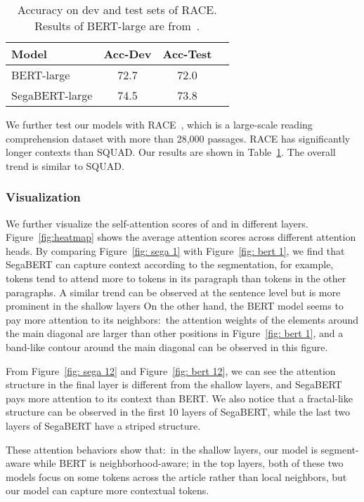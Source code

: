 \documentclass[letterpaper]{article}
\begin{document}
\begin{table}[t]\centering
  \small
  \begin{tabular}{lccc}\toprule
  Model&Acc-Dev &Acc-Test \\\midrule
  BERT-large &72.7 &72.0 \\
  SegaBERT-large &74.5 &73.8 \\
  \bottomrule
  \end{tabular}
  \caption{Accuracy on dev and test sets of RACE. Results of BERT-large are from~\citet{DBLP:conf/acl-mrqa/PanSYCJCY19}.}
  \label{tab: race}
  \end{table} 
We further test our models with RACE~\citep{DBLP:conf/emnlp/LaiXLYH17}, which is a large-scale reading comprehension dataset with more than 28,000 passages. 
RACE has significantly longer contexts than SQUAD.
Our results are shown in Table~\ref{tab: race}.
The overall trend is similar to SQUAD.






\subsubsection{Visualization}


We further visualize the self-attention scores of  and  in different layers. 
Figure~\ref{fig:heatmap} shows the average attention scores across different attention heads. 
By comparing Figure~\ref{fig: sega 1} with Figure~\ref{fig: bert 1}, we find that SegaBERT can capture context according to the segmentation, for example, tokens tend to attend more to tokens in its paragraph than tokens in the other paragraphs. 
A similar trend can be observed at the sentence level but is more prominent in the shallow layers
On the other hand, the BERT model seems to pay more attention to its neighbors:\ the attention weights of the elements around the main diagonal are larger than other positions in Figure~\ref{fig: bert 1}, and a band-like contour around the main diagonal can be observed in this figure.

From Figure~\ref{fig: sega 12} and Figure~\ref{fig: bert 12}, we can see the attention structure in the final layer is different from the shallow layers, and SegaBERT pays more attention to its context than BERT.
We also notice that a fractal-like structure can be observed in the first 10 layers of SegaBERT, while the last two layers of SegaBERT have a striped structure.

These attention behaviors show that:\ in the shallow layers, our model is segment-aware while BERT is neighborhood-aware; 
in the top layers, both of these two models focus on some tokens across the article rather than local neighbors, but our model can capture more contextual tokens.
\end{document}
